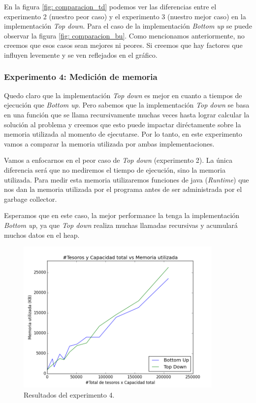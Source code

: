 \par En la figura \ref{fig: comparacion_td} podemos ver las diferencias entre el experimento 2 (nuestro peor caso) y el experimento 3 (nuestro mejor caso) en la implementación \textit{Top down}. Para el caso de la implementación \textit{Bottom up} se puede observar la figura \ref{fig: comparacion_bu}. Como mencionamos anteriormente, no creemos que esos casos sean mejores ni peores. Si creemos que hay factores que influyen levemente y se ven reflejados en el gráfico.

\subsubsection{Experimento 4: Medición de memoria}

\par Quedo claro que la implementación \textit{Top down} es mejor en cuanto a tiempos de ejecución que \textit{Bottom up}. Pero sabemos que la implementación \textit{Top down} se basa en una función que se llama recursivamente muchas veces hasta lograr calcular la solución al problema y creemos que esto puede impactar diréctamente sobre la memoria utilizada al momento de ejecutarse. Por lo tanto, en este experimento vamos a comparar la memoria utilizada por ambas implementaciones.

\par Vamos a enfocarnos en el peor caso de \textit{Top down} (experimento 2). La única diferencia será que no mediremos el tiempo de ejecución, sino la memoria utilizada. Para medir esta memoria utilizaremos funciones de java (\textit{Runtime}) que nos dan la memoria utilizada por el programa antes de ser administrada por el garbage collector.

\par Esperamos que en este caso, la mejor performance la tenga la implementación \textit{Bottom up}, ya que \textit{Top down} realiza muchas llamadas recursivas y acumulará muchos datos en el heap.

\begin{figure}[H]
	\centering
	\includegraphics[width=0.9\textwidth]{Problema3/img/exp4_memoria.png}
	\caption{Resultados del experimento 4.}
	\label{fig: exp4_memoria}
\end{figure}

